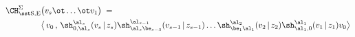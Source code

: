 \begin{equation}\begin{aligned}
 \CH_{\rm\sst S,E}^{\Sigma} & \big( v_s\ot\dots\ot v_1\big)\;=\;\\
& \big\langle\,v_0\, , \,
\sh_{0,\al_s}^{\al_s}( v_s\,|\,z_s)\sh_{\al_s\be_{s-3}}^{\al_{s-1}}
( v_{s-1}\,|\,z_{s-1})\dots
\sh_{\be_1\al_1}^{\al_{2}}( v_2\,|\,z_{2})\sh_{\al_1,0}^{\al_1}
( v_1\, |\,z_1) v_0
\big\rangle
\end{aligned}
\end{equation}

